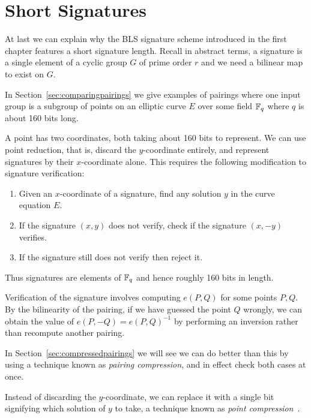 \section {Short Signatures}

At last we can explain why the BLS signature scheme introduced in the first
chapter features a short signature length. Recall in abstract terms, a
signature is a single element of a cyclic group $G$ of prime order $r$ and we
need a bilinear map to exist on $G$.

In Section~\ref{sec:comparingpairings} we give examples of pairings where one
input group is a subgroup of points on an elliptic curve $E$ over some field
$\mathbb{F}_q$ where $q$ is about 160 bits long.

A point has two coordinates, both taking about 160 bits to represent.
We can use point reduction, that is, discard the $y$-coordinate entirely,
and represent signatures by their $x$-coordinate alone. This requires
the following modification to signature verification:
\begin{enumerate}
\item
Given an $x$-coordinate of a signature, find any solution $y$ in the curve
equation $E$.
\item
If the signature $(x,y)$ does not verify, check if the signature $(x, -y)$
verifies.
\item
If the signature still does not verify then reject it.
\end{enumerate}

Thus signatures are elements of $\mathbb{F}_q$ and hence roughly 160 bits in length.

Verification of the signature involves computing $e(P, Q)$ for some points
$P, Q$. By the bilinearity of the pairing, if we have guessed the point $Q$
wrongly, we can obtain the value of $e(P,-Q) = e(P,Q)^{-1}$ by performing
an inversion rather than recompute another pairing.

In Section~\ref{sec:compressedpairings} we will see we can do better
than this by using a technique known as \emph{pairing compression}, and in
effect check both cases at once.

Instead of discarding the $y$-coordinate, we can replace it with a single bit
signifying which solution of $y$ to take, a technique known as \emph{point
compression}~\cite[Section IV.4]{bss}.

